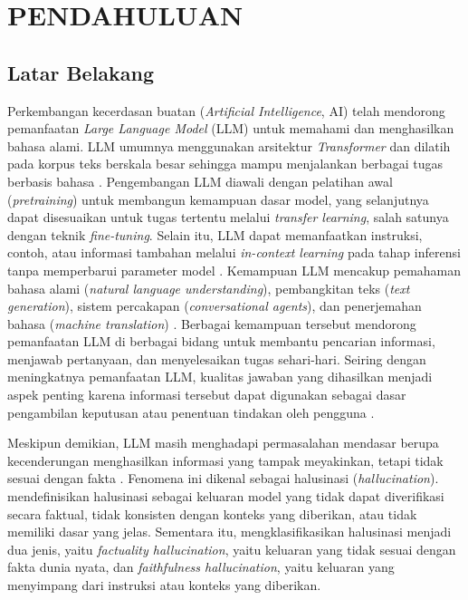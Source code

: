 \cleardoublepage %
\chapter{PENDAHULUAN}
\label{chap:pendahuluan}
\section{Latar Belakang}

Perkembangan kecerdasan buatan (\emph{Artificial Intelligence}, AI) telah mendorong pemanfaatan \emph{Large Language Model} (LLM) untuk memahami dan menghasilkan bahasa alami. LLM umumnya menggunakan arsitektur \emph{Transformer} dan dilatih pada korpus teks berskala besar sehingga mampu menjalankan berbagai tugas berbasis bahasa \autocite{Kumar2024}. Pengembangan LLM diawali dengan pelatihan awal (\emph{pretraining}) untuk membangun kemampuan dasar model, yang selanjutnya dapat disesuaikan untuk tugas tertentu melalui \emph{transfer learning}, salah satunya dengan teknik \emph{fine-tuning}. Selain itu, LLM dapat memanfaatkan instruksi, contoh, atau informasi tambahan melalui \emph{in-context learning} pada tahap inferensi tanpa memperbarui parameter model \autocite{Patil2024}. Kemampuan LLM mencakup pemahaman bahasa alami (\emph{natural language understanding}), pembangkitan teks (\emph{text generation}), sistem percakapan (\emph{conversational agents}), dan penerjemahan bahasa (\emph{machine translation}) \autocite{Qin2025}. Berbagai kemampuan tersebut mendorong pemanfaatan LLM di berbagai bidang untuk membantu pencarian informasi, menjawab pertanyaan, dan menyelesaikan tugas sehari-hari. Seiring dengan meningkatnya pemanfaatan LLM, kualitas jawaban yang dihasilkan menjadi aspek penting karena informasi tersebut dapat digunakan sebagai dasar pengambilan keputusan atau penentuan tindakan oleh pengguna \autocite{Syeda2026, WangXL2026}.

Meskipun demikian, LLM masih menghadapi permasalahan mendasar berupa kecenderungan menghasilkan informasi yang tampak meyakinkan, tetapi tidak sesuai dengan fakta \autocite{Ji2023, YizhengHuang2026}. Fenomena ini dikenal sebagai halusinasi (\emph{hallucination}). \textcite{Ji2023} mendefinisikan halusinasi sebagai keluaran model yang tidak dapat diverifikasi secara faktual, tidak konsisten dengan konteks yang diberikan, atau tidak memiliki dasar yang jelas. Sementara itu, \textcite{Huang2025} mengklasifikasikan halusinasi menjadi dua jenis, yaitu \emph{factuality hallucination}, yaitu keluaran yang tidak sesuai dengan fakta dunia nyata, dan \emph{faithfulness hallucination}, yaitu keluaran yang menyimpang dari instruksi atau konteks yang diberikan.

